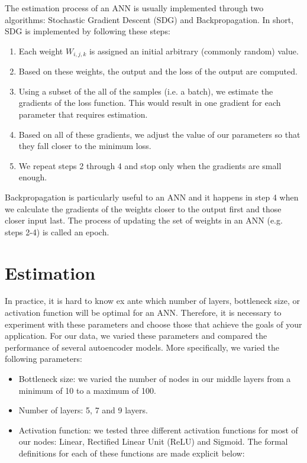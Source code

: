 \documentclass{article}
\begin{document}
The estimation process of an ANN is usually implemented through two algorithms: Stochastic Gradient Descent (SDG) and Backpropagation. In short, SDG is implemented by following these steps:

\begin{enumerate}
   \item Each weight \begin{math}W_{i,j,k}\end{math} is assigned an initial arbitrary (commonly random) value. 
   \item Based on these weights, the output and the loss of the output are computed.
   \item Using a subset of the all of the samples (i.e. a batch), we estimate the gradients of the loss function. This would result in one gradient for each parameter that requires estimation. 
   \item Based on all of these gradients, we adjust the value of our parameters so that they fall closer to the minimum loss.
   \item We repeat steps 2 through 4 and stop only when the gradients are small enough. 
 \end{enumerate}

Backpropagation is particularly useful to an ANN and it happens in step 4 when we calculate the gradients of the weights closer to the output first and those closer input last. The process of updating the set of weights in an ANN (e.g. steps 2-4) is called an epoch. 
 
\section{Estimation}

In practice, it is hard to know ex ante which number of layers, bottleneck size, or activation function will be optimal for an  ANN. Therefore, it is necessary to experiment with these parameters and choose those that achieve the goals of your application. For our data, we varied these parameters and compared the performance of several autoencoder models. More specifically, we varied the following parameters:

\begin{itemize}
  \item Bottleneck size: we varied the number of nodes in our middle layers from a minimum of 10 to a maximum of 100.
  \item Number of layers: 5, 7 and 9 layers. 
  \item Activation function: we tested three different activation functions for most of our nodes: Linear, Rectified Linear Unit (ReLU) and Sigmoid. The formal definitions for each of these functions are made explicit below:  
\end{itemize}
\end{document}
